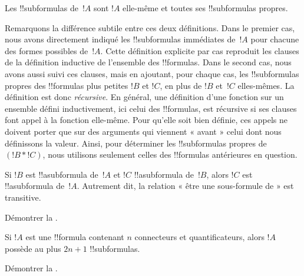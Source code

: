 \documentclass[../../../include/open-logic-section]{subfiles}
\begin{document}
\begin{defn}
Les !!{subformula}s de~$!A$ sont $!A$ elle-même et toutes ses
!!{subformula}s propres.
\end{defn}

\begin{explain}
Remarquons la différence subtile entre ces deux définitions. Dans le
premier cas, nous avons directement indiqué les !!{subformula}s
immédiates de~$!A$ pour chacune des formes possibles de~$!A$. Cette
définition explicite par cas reproduit les clauses de la définition
inductive de l'ensemble des !!{formula}s. Dans le second cas, nous
avons aussi suivi ces clauses, mais en ajoutant, pour chaque cas,
les !!{subformula}s propres des !!{formula}s plus petites $!B$ et
$!C$, en plus de $!B$ et~$!C$ elles-mêmes. La définition est donc
\emph{récursive}. En général, une définition d'une fonction sur un
ensemble défini inductivement, ici celui des !!{formula}s, est
récursive si ses clauses font appel à la fonction elle-même. Pour
qu'elle soit bien définie, ces appels ne doivent porter que sur des
arguments qui viennent « avant » celui dont nous définissons la
valeur. Ainsi, pour déterminer les !!{subformula}s propres de
$(!B \ast !C)$, nous utilisons seulement celles des !!{formula}s
antérieures en question.
\end{explain}

\begin{prop}
Si $!B$ est !!a{subformula} de~$!A$ et $!C$ !!a{subformula} de~$!B$,
alors $!C$ est !!a{subformula} de~$!A$. Autrement dit, la relation
« être une sous-formule de » est transitive.
\end{prop}

\begin{prob}
Démontrer la .
\end{prob}

\begin{prop}
Si $!A$ est une !!{formula} contenant $n$ connecteurs et
quantificateurs, alors $!A$ possède au plus $2n+1$ !!{subformula}s.
\end{prop}

\begin{prob}
Démontrer la .
\end{prob}
\end{document}

